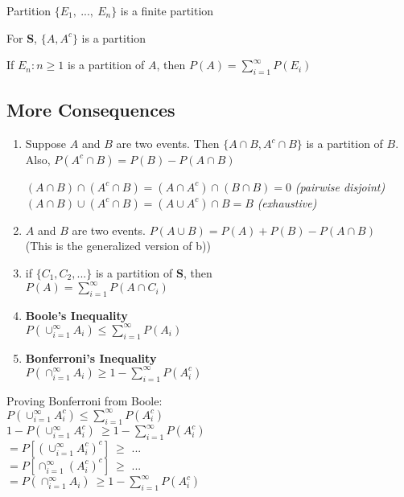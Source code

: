 \documentclass[14pt, oneside, letterpaper]{notes}
\begin{document}
\begin{remark}
	Partition $\{E_1, \: ..., \: E_n \}$ is a finite partition
\end{remark}

\begin{remark}
	For \textbf{S}, $\{A, A^c\}$ is a partition
\end{remark}

\begin{remark}
	If $E_n: n \geq 1$ is a partition of $A$, then $P(A) = \sum_{i=1}^{\infty} P(E_i)$
\end{remark}

\subsection*{More Consequences} 
\begin{enumerate}[resume]
	\item Suppose $A$ and $B$ are two events.  Then $\{A \cap B, A^c \cap B\}$
	is a partition of $B$.  Also, $P(A^c \cap B) = P(B) - P(A \cap B)$ 

	\begin{myproof}
		$(A \cap B) \cap (A^c \cap B) = 
		(A \cap A^c) \cap (B \cap B) = 0$  \textit{(pairwise disjoint)} \\
		$(A \cap B) \cup (A^c \cap B) = (A \cup A^c) \cap B = B $ 
		\textit{(exhaustive)} 
	\end{myproof}

	\item $A$ and $B$ are two events.  $P(A \cup B) = P(A) + P(B) - P(A \cap B)$ \\
	(This is the generalized version of b)) 

	\item if $\{C_1, C_2, ... \}$ is a partition of \textbf{S}, then \\
	$P(A) = \sum_{i=1}^{\infty} P(A \cap C_i)$ 

	\item\textbf{Boole's Inequality} \\
	\indent $P(\cup_{i=1}^{\infty} A_i) \leq \sum_{i=1}^{\infty}P(A_i)$ 
	
	\item \textbf{Bonferroni's Inequality}\\
	$P(\cap_{i=1}^{\infty} A_i) \geq 1 - \sum_{i=1}^{\infty} P(A_i^c)$
\end{enumerate}

\begin{remark}
	Proving Bonferroni from Boole: \\
	\indent $P(\cup_{i=1}^{\infty} A_i^c) \leq 
	\sum_{i=1}^{\infty} P(A_i^c)$ \\
	\indent $1- P(\cup_{i=1}^{\infty} A_i^c) \:  \geq
	1 - \sum_{i=1}^{\infty} P(A_i^c)$ \\
	\indent $ = P[(\cup_{i=1}^{\infty} A_i^c)^c] \: \geq$ ...  \\
	\indent $ = P[\cap_{i=1}^{\infty} (A_i^c)^c] \: \geq$ ... \\
	\indent $ = P(\cap_{i=1}^{\infty} A_i ) \: \geq
	1- \sum_{i=1}^{\infty} P(A_i^c)$ 
\end{remark}
\end{document}
